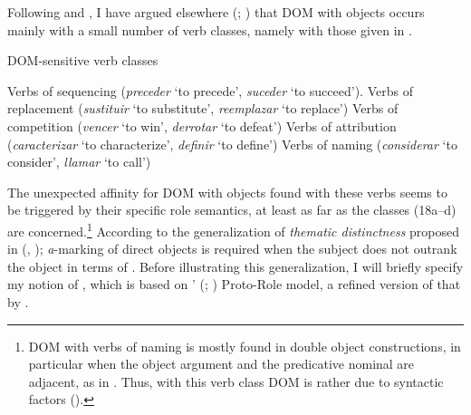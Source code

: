 \documentclass[output=paper]{LSP/langsci}
\begin{document}
Following \citet{Weissenrieder1985Exceptional,Weissenrieder1991Functional} and \citet{Delbecque2002Construction}, I have argued elsewhere (\cf \citealt[65--66]{Garcia2007Inanimate}; \citeyear[147--189]{GarciaGarcia2014Objektmarkierung}) that DOM with  objects occurs mainly with a small number of verb classes, namely with those given in .

\begin{exe}
\ex DOM-sensitive verb classes \label{08-ga-ex:18}

\ea Verbs of sequencing (\eg \textit{preceder} ‘to precede’, \textit{suceder} ‘to succeed’). \label{08-ga-ex:18a} 
\ex Verbs of replacement (\eg \textit{sustituir} ‘to substitute’, \textit{reemplazar} ‘to replace’) \label{08-ga-ex:18b} 
\ex Verbs of competition (\eg \textit{vencer} ‘to win’, \textit{derrotar} ‘to defeat’) \label{08-ga-ex:18c} 
\ex Verbs of attribution (\eg \textit{caracterizar} ‘to characterize’, \textit{definir} ‘to define’)\label{08-ga-ex:18d} 
\ex Verbs of naming (\eg \textit{considerar} ‘to consider’, \textit{llamar} ‘to call’) \label{08-ga-ex:18e} 
\z
\end{exe}

The unexpected affinity for DOM with  objects found with these verbs seems to be triggered by their specific role semantics, at least as far as the classes (18a--d) are concerned.\footnote{DOM with verbs of naming is mostly found in double object constructions, in particular when the object argument and the predicative nominal are adjacent, as in . Thus, with this verb class DOM is rather due to syntactic factors (\cf \citealt[102--104]{GarciaGarcia2014Objektmarkierung}).} According to the generalization of \textit{thematic distinctness} proposed in \citeauthor{Garcia2007Inanimate} (\citeyear[71]{Garcia2007Inanimate}, \citeyear[145]{GarciaGarcia2014Objektmarkierung}); \textit{a}-marking of  direct objects is required when the subject does not outrank the object in terms of . Before illustrating this generalization, I will briefly specify my notion of , which is based on \citeauthor{Primus1999Cases}’ (\citeyear{Primus1999Cases};  \citeyear{Primus2006Hierarchy}) Proto-Role model, a refined version of that by \citet{Dowty1991Thematic}. 
\end{document}
